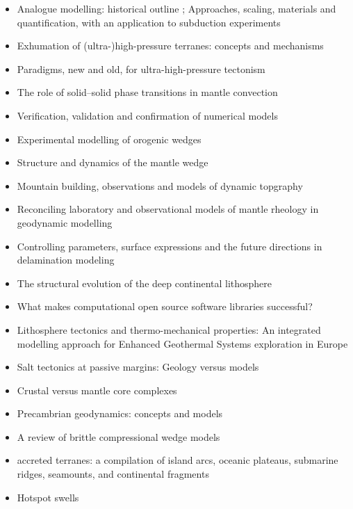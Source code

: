 \begin{itemize}
\item Analogue modelling: historical outline \cite{koyi97}; Approaches, scaling, materials and quantification, with an application to subduction experiments \cite{scst16}
\item Exhumation of (ultra-)high-pressure terranes: concepts and mechanisms \cite{warr13}
\item Paradigms, new and old, for ultra-high-pressure tectonism \cite{hage13}
\item The role of solid–solid phase transitions in mantle convection \cite{fada17}
\item Verification, validation and confirmation of numerical models \cite{orsb94}
\item Experimental modelling of orogenic wedges \cite{grmd12}
\item Structure and dynamics of the mantle wedge \cite{vank03}
\item Mountain building, observations and models of dynamic topgraphy \cite{flgm13,fabc13}
\item Reconciling laboratory and observational models of mantle rheology in geodynamic modelling \cite{king16}
\item Controlling parameters, surface expressions and the future directions in delamination modeling \cite{goue18}
\item The structural evolution of the deep continental lithosphere \cite{comm17}
\item What makes computational open source software libraries successful? \cite{bahe13}
\item Lithosphere tectonics and thermo-mechanical properties: An integrated modelling
approach for Enhanced Geothermal Systems exploration in Europe \cite{clvz10}
\item Salt tectonics at passive margins: Geology versus models \cite{brfo11}
\item Crustal versus mantle core complexes \cite{brst18}
\item Precambrian geodynamics: concepts and models \cite{gery14}
\item A review of brittle compressional wedge models \cite{buit12}
\item accreted terranes: a compilation of island arcs, oceanic
      plateaus, submarine ridges, seamounts, and continental fragments \cite{tebu14}
\item Hotspot swells \cite{kiad14}
\end{itemize}

